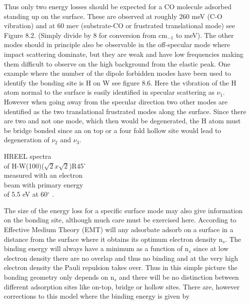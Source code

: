  Thus only two energy losses should be expected for a CO molecule adsorbed standing up on the surface. These are observed at roughly 260 meV (C-O vibration) and at 60 mev (substrate-CO or frustrated translational mode) see Figure 8.2. (Simply divide by 8 for conversion from cm$_{-1}$ to meV). The other modes should in principle also be observable in the off-specular mode where impact scattering dominate, but they are weak and have low frequencies making them difficult to observe on the high background from the elastic peak. One example where the number of the dipole forbidden modes have been used to identify the bonding site is H on W \cite{Barnes} see figure 8.6. Here the vibration of the H atom normal to the surface is easily identified in specular scattering as  $\nu_1$. However when going away from the specular direction two other modes are  identified as the two translational frustrated modes along the surface. Since there are two and not one mode, which then would be degenerated, the H atom must be bridge bonded since an on top or a  four fold hollow site would lead to degeneration of $\nu_2$ and $\nu_3$. 



\vspace*{14cm}

 HREEL spectra\\ of H-W(100)($\sqrt{2}x\sqrt{2}$)R45$^{\circ}$\\ measured with an electron\\ beam with primary energy\\ of 5.5 eV at 60$^{\circ}$ \cite{Barnes}.

\vspace{1cm} 

The size of the energy loss for a specific surface mode may also give information on the bonding site, although much care must be exercised here. According to Effective Medium Theory (EMT) will any adsorbate adsorb on a surface in a distance from the surface where it obtains its optimum electron density n$_{s}$. The binding energy will always have a minimum as a function of n$_{s}$ since at low electron density there are no overlap and thus no binding and at the very high electron density the Pauli repulsion takes over. Thus in this simple picture the bonding geometry only depends on n$_{s}$ and there will be no distinction between different adsorption sites like on-top, bridge or hollow sites. There are, however corrections to this model where the binding energy is  given by  

